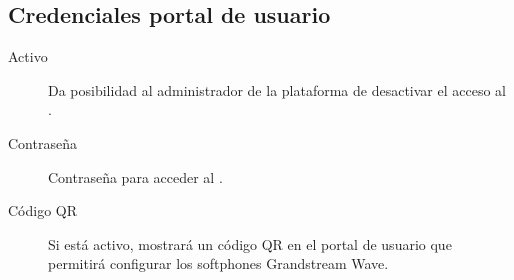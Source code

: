\documentclass[letterpaper,10pt,spanish]{sphinxmanual}
\begin{document}
\subsection{Credenciales portal de usuario}
\label{pbx_features/users:login-info}
\noindent{}
\begin{description}
\item[{Activo}] \leavevmode{}\label{pbx_features/users:term-active}
Da posibilidad al administrador de la plataforma de desactivar el acceso al {\hyperref[userportal/index:userportal]{}}.

\item[{Contraseña}] \leavevmode{}\label{pbx_features/users:term-password}
Contraseña para acceder al {\hyperref[userportal/index:userportal]{}}.

\item[{Código QR}] \leavevmode{}\label{pbx_features/users:term-qr-code}
Si está activo, mostrará un código QR en el portal de usuario que permitirá configurar los softphones Grandstream Wave.

\end{description}
\end{document}
